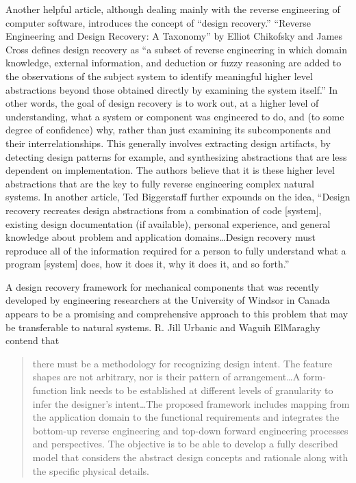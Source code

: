 Another helpful article, although dealing mainly with the reverse
engineering of computer software, introduces the concept of ``design
recovery.'' ``Reverse Engineering and Design Recovery: A Taxonomy'' by
Elliot Chikofsky and James Cross defines design recovery as ``a subset
of reverse engineering in which domain knowledge, external information,
and deduction or fuzzy reasoning are added to the observations of the
subject system to identify meaningful higher level abstractions beyond
those obtained directly by examining the system
itself.''\citep[][p.~15]{chikofskycross1990}
In other words, the goal of design
recovery is to work out, at a higher level of understanding, what a
system or component was engineered to do, and (to some degree of
confidence) why, rather than just examining its subcomponents and their
interrelationships. This generally involves extracting design
artifacts, by detecting design patterns for example, and synthesizing
abstractions that are less dependent on implementation. The authors
believe that it is these higher level abstractions that are the key to
fully reverse engineering complex natural systems. In another article,
Ted Biggerstaff further expounds on the idea, ``Design recovery
recreates design abstractions from a combination of code [system],
existing design documentation (if available), personal experience, and
general knowledge about problem and application domains{\ldots}Design recovery
must reproduce all of the information required for a person to fully
understand what a program [system] does, how it does it, why it does
it, and so forth.''\citep[][p.~36]{biggerstaff1989}

A design recovery framework for mechanical components that was recently
developed by engineering researchers at the University of Windsor in
Canada appears to be a promising and comprehensive approach to this
problem that may be transferable to natural systems. R. Jill Urbanic
and Waguih ElMaraghy contend that 

\begin{quote}
there must be a methodology for
recognizing design intent. The feature shapes are not arbitrary, nor is
their pattern of arrangement{\ldots}A form-function link needs to be
established at different levels of granularity to infer the designer’s
intent{\ldots}The proposed framework includes mapping from the application
domain to the functional requirements and integrates the bottom-up
reverse engineering and top-down forward engineering processes and
perspectives. The objective is to be able to develop a fully described
model that considers the abstract design concepts and rationale along
with the specific physical details. \citep{urbanicelmaraghy2009}
\end{quote}

